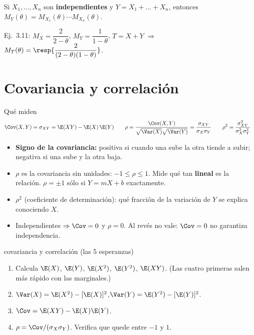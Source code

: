 Si $X_1,\dots,X_n$ son \textbf{independientes} y $Y=X_1+\dots+X_n$, entonces
$M_Y(\theta)=M_{X_1}(\theta)\cdots M_{X_n}(\theta)$.

Ej.~3.11: $M_X=\dfrac{2}{2-\theta}$, $M_Y=\dfrac{1}{1-\theta}$, $T=X+Y$ $\Rightarrow$
$M_T(\theta)=\resp{\dfrac{2}{(2-\theta)(1-\theta)}}$.

\section{Covariancia y correlaci\'on}\label{sec:cov}

\begin{teoria}{Qu\'e miden}
\[
\Cov(X,Y)=\sigma_{XY}=\E(XY)-\E(X)\,\E(Y)
\qquad
\rho=\frac{\Cov(X,Y)}{\sqrt{\Var(X)}\sqrt{\Var(Y)}}=\frac{\sigma_{XY}}{\sigma_X\sigma_Y}
\qquad
\rho^2=\frac{\sigma_{XY}^2}{\sigma_X^2\sigma_Y^2}
\]
\begin{itemize}
\item \textbf{Signo de la covariancia:} positiva si cuando una sube la otra tiende a subir; negativa si una sube y la otra baja.
\item $\rho$ es la covariancia sin unidades: $-1\le\rho\le1$. Mide qu\'e tan \textbf{lineal} es la relaci\'on.
$\rho=\pm1$ s\'olo si $Y=mX+b$ exactamente.
\item $\rho^2$ (coeficiente de determinaci\'on): qu\'e fracci\'on de la variaci\'on de $Y$ se explica conociendo $X$.
\item Independientes $\Rightarrow\Cov=0$ y $\rho=0$. Al rev\'es no vale: $\Cov=0$ no garantiza independencia.
\end{itemize}
\end{teoria}

\begin{receta}{covariancia y correlaci\'on (las 5 esperanzas)}
\begin{enumerate}
\item Calcula $\E(X)$, $\E(Y)$, $\E(X^2)$, $\E(Y^2)$, $\E(XY)$.
(Las cuatro primeras salen m\'as r\'apido con las marginales.)
\item $\Var(X)=\E(X^2)-[\E(X)]^2$,\quad $\Var(Y)=\E(Y^2)-[\E(Y)]^2$.
\item $\Cov=\E(XY)-\E(X)\E(Y)$.
\item $\rho=\Cov/(\sigma_X\sigma_Y)$. Verifica que quede entre $-1$ y $1$.
\end{enumerate}
\end{receta}

